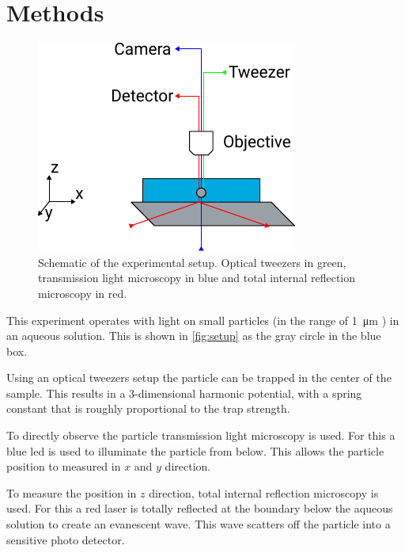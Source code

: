 \documentclass[
    twoside=false,
    twocolumn=true,
    fontsize=11pt,
]{scrarticle}
\begin{document}


\section{Methods}
\begin{figure}
    \centering
    \includegraphics{figures/setup.pdf}
    \caption{Schematic of the experimental setup. Optical tweezers in green, transmission light microscopy in blue and total internal reflection microscopy in red.}
    \label{fig:setup}
\end{figure}
This experiment operates with light on small particles (in the range of \SI{1}{\micro m} \cite{instructions}) in an aqueous solution.
This is shown in \autoref{fig:setup} as the gray circle in the blue box. 

Using an optical tweezers setup the particle can be trapped in the center of the sample.
This results in a 3-dimensional harmonic potential, with a spring constant that is roughly proportional to the trap strength.

To directly observe the particle transmission light microscopy is used.
For this a blue led is used to illuminate the particle from below.
This allows the particle position to measured in $x$ and $y$ direction.

To measure the position in $z$ direction, total internal reflection microscopy is used.
For this a red laser is totally reflected at the boundary below the aqueous solution to create an evanescent wave.
This wave scatters off the particle into a sensitive photo detector.

\end{document}
